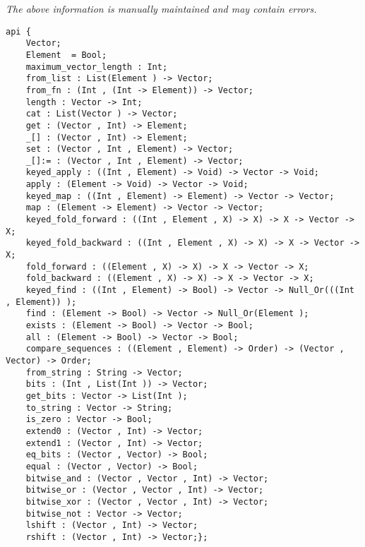 \label{api:Bool\_Vector}

{\tiny \it The above information is manually maintained and may contain errors.}
\begin{verbatim}
api {
    Vector;
    Element  = Bool;
    maximum_vector_length : Int;
    from_list : List(Element ) -> Vector;
    from_fn : (Int , (Int -> Element)) -> Vector;
    length : Vector -> Int;
    cat : List(Vector ) -> Vector;
    get : (Vector , Int) -> Element;
    _[] : (Vector , Int) -> Element;
    set : (Vector , Int , Element) -> Vector;
    _[]:= : (Vector , Int , Element) -> Vector;
    keyed_apply : ((Int , Element) -> Void) -> Vector -> Void;
    apply : (Element -> Void) -> Vector -> Void;
    keyed_map : ((Int , Element) -> Element) -> Vector -> Vector;
    map : (Element -> Element) -> Vector -> Vector;
    keyed_fold_forward : ((Int , Element , X) -> X) -> X -> Vector -> X;
    keyed_fold_backward : ((Int , Element , X) -> X) -> X -> Vector -> X;
    fold_forward : ((Element , X) -> X) -> X -> Vector -> X;
    fold_backward : ((Element , X) -> X) -> X -> Vector -> X;
    keyed_find : ((Int , Element) -> Bool) -> Vector -> Null_Or(((Int , Element)) );
    find : (Element -> Bool) -> Vector -> Null_Or(Element );
    exists : (Element -> Bool) -> Vector -> Bool;
    all : (Element -> Bool) -> Vector -> Bool;
    compare_sequences : ((Element , Element) -> Order) -> (Vector , Vector) -> Order;
    from_string : String -> Vector;
    bits : (Int , List(Int )) -> Vector;
    get_bits : Vector -> List(Int );
    to_string : Vector -> String;
    is_zero : Vector -> Bool;
    extend0 : (Vector , Int) -> Vector;
    extend1 : (Vector , Int) -> Vector;
    eq_bits : (Vector , Vector) -> Bool;
    equal : (Vector , Vector) -> Bool;
    bitwise_and : (Vector , Vector , Int) -> Vector;
    bitwise_or : (Vector , Vector , Int) -> Vector;
    bitwise_xor : (Vector , Vector , Int) -> Vector;
    bitwise_not : Vector -> Vector;
    lshift : (Vector , Int) -> Vector;
    rshift : (Vector , Int) -> Vector;};
\end{verbatim}
\index[fun]{\_[]:=}
\index[fun]{\_[]}
